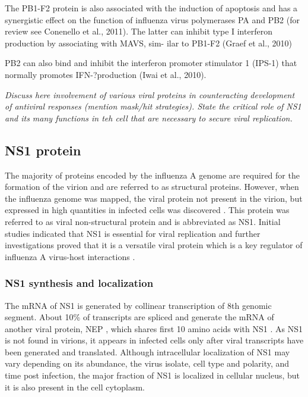 	The PB1-F2 protein is also associated with the induction of apoptosis and has a synergistic effect on the function of influenza virus polymerases PA and PB2 (for review see Conenello et al., 2011). The latter can inhibit type I interferon production by associating with MAVS, sim- ilar to PB1-F2 (Graef et al., 2010)
	
	PB2 can also bind and inhibit the interferon promoter stimulator 1 (IPS-1) that normally promotes IFN-?production (Iwai et al., 2010).
	
	
		\textit{Discuss here involvement of various viral proteins in counteracting development of antiviral responses (mention mask/hit strategies). State the critical role of NS1 and its many functions in teh cell that are necessary to secure viral replication.}
			
	\subsection{NS1 protein}
		
		The majority of proteins encoded by the influenza A genome are required for the formation of the virion and are referred to as structural proteins. However, when the influenza genome was mapped, the viral protein not present in the virion, but expressed in high quantities in infected cells was discovered \parencite{Ritchey1976}. This protein was referred to as viral non-structural protein and is abbreviated as \gls{NS1}. Initial studies indicated that \gls{NS1} is essential for viral replication \parencite{Koennecke1981} and further investigations proved that it is a versatile viral protein which is a key regulator of influenza A virus-host interactions \parencite{Ayllon2015}.
		
		\subsubsection{NS1 synthesis and localization}
		
		The mRNA of \gls{NS1} is generated by collinear transcription of 8th genomic segment. About 10\% of transcripts are spliced and generate the mRNA of another viral protein, \gls{NEP} \parencite{Lamb1980}, which shares first 10 amino acids with \gls{NS1} \parencite{Inglis1979, Lamb1979, Lamb1980}. As \gls{NS1} is not found in virions, it appears in infected cells only after viral transcripts have been generated and translated. Although intracellular localization of \gls{NS1} may vary depending on its abundance, the virus isolate, cell type and polarity, and time post infection, the major fraction of \gls{NS1} is localized in cellular nucleus, but it is also present in the cell cytoplasm\parencite{Melen2007, Melen2012, Newby2007, Li1998, Greenspan1988}. 
		
